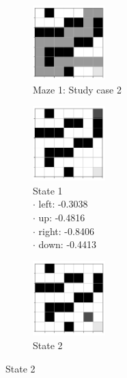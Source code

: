 \documentclass[a4paper]{article}    %
\begin{document}
\begin{figure}[H]
    \centering
    \begin{subfigure}{0.24\textwidth}
        \centering
        \includegraphics[width=2.8cm]{maze1-case2}
        \caption{Maze 1: Study case 2 \vspace{12mm}}
        \label{fig:maze1-case2-states}
    \end{subfigure}
    \hfill
    \centering
    \begin{subfigure}{0.24\textwidth}
        \centering
        \includegraphics[width=2.8cm]{maze1-case2-state1}
        \captionsetup{singlelinecheck=off}
        \caption{State 1 \\
            \scriptsize
            \hspace*{5mm} $\boldsymbol{\cdot}$ left:  -0.3038 \\
            \hspace*{5mm} $\boldsymbol{\cdot}$ up:    -0.4816 \\
            \hspace*{5mm} $\boldsymbol{\cdot}$ right: -0.8406 \\
            \hspace*{5mm} $\boldsymbol{\cdot}$ down:  -0.4413 }
        \label{fig:maze1-case2-state1}
    \end{subfigure}
    \hfill
    \begin{subfigure}{0.24\textwidth}
        \centering
        \includegraphics[width=2.8cm]{maze1-case2-state2}
        \caption{State 2 \\
            \scriptsize
}
\end{subfigure}
\end{figure}
\end{document}

